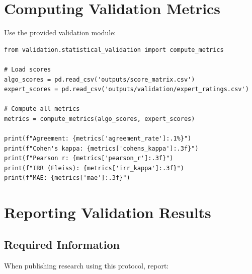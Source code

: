 \documentclass[11pt]{article}
\begin{document}
\section{Computing Validation Metrics}

Use the provided validation module:

\begin{verbatim}
from validation.statistical_validation import compute_metrics

# Load scores
algo_scores = pd.read_csv('outputs/score_matrix.csv')
expert_scores = pd.read_csv('outputs/validation/expert_ratings.csv')

# Compute all metrics
metrics = compute_metrics(algo_scores, expert_scores)

print(f"Agreement: {metrics['agreement_rate']:.1%}")
print(f"Cohen's kappa: {metrics['cohens_kappa']:.3f}")
print(f"Pearson r: {metrics['pearson_r']:.3f}")
print(f"IRR (Fleiss): {metrics['irr_kappa']:.3f}")
print(f"MAE: {metrics['mae']:.3f}")
\end{verbatim}

\section{Reporting Validation Results}

\subsection{Required Information}

When publishing research using this protocol, report:
\end{document}
